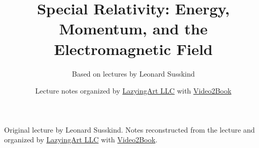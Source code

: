 \documentclass[11pt,oneside]{book}
\begin{document}
\frontmatter
\title{Special Relativity: Energy, Momentum, and the Electromagnetic Field}
\author{Based on lectures by Leonard Susskind}
\date{Lecture notes organized by \href{https://lazying.art}{LazyingArt LLC} with \href{https://github.com/lachlanchen/Video2Book}{Video2Book}}
\maketitle
\begin{center}
\small Original lecture by Leonard Susskind. Notes reconstructed from the lecture and organized by \href{https://lazying.art}{LazyingArt LLC} with \href{https://github.com/lachlanchen/Video2Book}{Video2Book}.
\end{center}
\clearpage
\mainmatter

\end{document}
